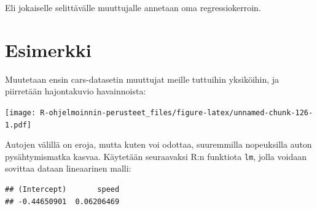 \documentclass[
]{book}
\newenvironment{Shaded}{\begin{snugshade}}{\end{snugshade}}
\newcommand{\AttributeTok}[1]{\textcolor[rgb]{0.77,0.63,0.00}{#1}}
\newcommand{\CommentTok}[1]{\textcolor[rgb]{0.56,0.35,0.01}{\textit{#1}}}
\newcommand{\FloatTok}[1]{\textcolor[rgb]{0.00,0.00,0.81}{#1}}
\newcommand{\FunctionTok}[1]{\textcolor[rgb]{0.00,0.00,0.00}{#1}}
\newcommand{\NormalTok}[1]{#1}
\newcommand{\OtherTok}[1]{\textcolor[rgb]{0.56,0.35,0.01}{#1}}
\newcommand{\SpecialCharTok}[1]{\textcolor[rgb]{0.00,0.00,0.00}{#1}}
\newcommand{\StringTok}[1]{\textcolor[rgb]{0.31,0.60,0.02}{#1}}
\begin{document}
Eli jokaiselle selittävälle muuttujalle annetaan oma regressiokerroin.

\hypertarget{esimerkki}{%
\section{Esimerkki}\label{esimerkki}}

Muutetaan ensin cars-datasetin muuttujat meille tuttuihin yksiköihin, ja piirretään hajontakuvio havainnoista:

\begin{Shaded}
\end{Shaded}

\texttt{[image: R-ohjelmoinnin-perusteet\_files/figure-latex/unnamed-chunk-126-1.pdf]}

Autojen välillä on eroja, mutta kuten voi odottaa, suuremmilla nopeuksilla auton pysähtymismatka kasvaa. Käytetään seuraavaksi R:n funktiota \texttt{lm}, jolla voidaan sovittaa dataan lineaarinen malli:

\begin{Shaded}
\end{Shaded}

\begin{verbatim}
## (Intercept)       speed 
## -0.44650901  0.06206469
\end{verbatim}
\end{document}
